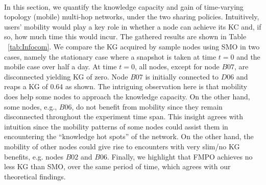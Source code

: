 \documentclass[conference]{IEEEtran}
\theoremstyle{definition}
\begin{document}
%
\vspace{0.1 cm}
\\
In this section, we quantify the knowledge capacity and gain of time-varying topology (mobile) multi-hop networks, under the two sharing policies. 
Intuitively, users' mobility would play a key role in whether a node can achieve its 
KC and, if so, how much time this would incur. 
%
%
The gathered results are shown in Table ~\ref{tab:Infocom}. We compare the KG acquired by 
sample nodes using SMO in two cases, namely the stationary case where a snapshot is taken at time $t=0$ and the mobile case over half a day. At time $t=0$, 
all nodes, except for node $B07$, are disconnected yielding KG of zero. Node $B07$ is initially connected to $D06$ and reaps a KG of 0.64 as shown. The intriguing observation here is that mobility does help some nodes to approach the knowledge capacity. On the other hand, some nodes, e.g., $B06$, do not benefit from mobility since they remain disconnected throughout the 
experiment time span. This insight agrees with intuition since the mobility patterns of some nodes could assist them in encountering the ``knowledge hot spots'' of the network.
On the other hand, the mobility of other nodes could give rise to encounters with very slim/no 
KG benefits, e.g. nodes $B02$ and $B06$. Finally, we highlight that FMPO achieves no less KG than SMO, over the same period of time, which agrees with our theoretical findings.
\end{document}
